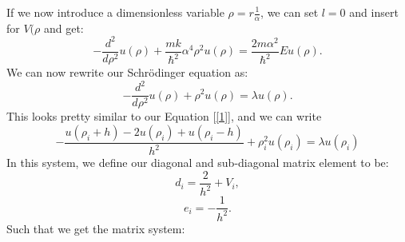\documentclass{article}
\begin{document}
\newline
If we now introduce a dimensionless variable $\rho = r\frac{1}{\alpha}$, we can set $l = 0$ and insert for $V(\rho$ and get:
\begin{equation*}
  -\frac{d^2}{d\rho^2} u(\rho) 
       + \frac{mk}{\hbar^2} \alpha^4\rho^2u(\rho)  = \frac{2m\alpha^2}{\hbar^2}E u(\rho) .
\end{equation*}
We can now rewrite our Schrödinger equation as:
\begin{equation}
  -\frac{d^2}{d\rho^2} u(\rho) + \rho^2u(\rho)  = \lambda u(\rho) .
\end{equation}
\newline
This looks pretty similar to our Equation [\ref{1}], and we can write
\begin{equation}
    -\frac{u(\rho_i+h) -2u(\rho_i) +u(\rho_i-h)}{h^2}+\rho_i^2u(\rho_i)  = \lambda u(\rho_i)
\end{equation}
In this system, we define our diagonal and sub-diagonal matrix element to be:
\begin{equation}
   d_i=\frac{2}{h^2}+V_i,
\end{equation}
\begin{equation}
   e_i=-\frac{1}{h^2}.
\end{equation}
Such that we get the matrix system:
\end{document}
